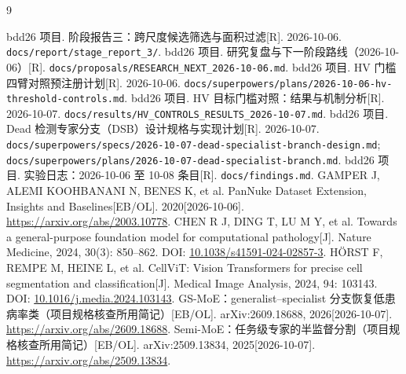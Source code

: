 \documentclass[11pt,a4paper,UTF8,fontset=fandol]{ctexart}
\newcommand{\code}[1]{\nolinkurl{#1}}
\begin{document}
\begin{thebibliography}{9}
\raggedright
{} bdd26 项目. 阶段报告三：跨尺度候选筛选与面积过滤[R]. 2026-10-06. \code{docs/report/stage_report_3/}.
 bdd26 项目. 研究复盘与下一阶段路线（2026-10-06）[R]. \code{docs/proposals/RESEARCH_NEXT_2026-10-06.md}.
 bdd26 项目. HV 门槛四臂对照预注册计划[R]. 2026-10-06. \code{docs/superpowers/plans/2026-10-06-hv-threshold-controls.md}.
 bdd26 项目. HV 目标门槛对照：结果与机制分析[R]. 2026-10-07. \code{docs/results/HV_CONTROLS_RESULTS_2026-10-07.md}.
 bdd26 项目. Dead 检测专家分支（DSB）设计规格与实现计划[R]. 2026-10-07. \code{docs/superpowers/specs/2026-10-07-dead-specialist-branch-design.md}; \code{docs/superpowers/plans/2026-10-07-dead-specialist-branch.md}.
 bdd26 项目. 实验日志：2026-10-06 至 10-08 条目[R]. \code{docs/findings.md}.
 GAMPER J, ALEMI KOOHBANANI N, BENES K, et al. PanNuke Dataset Extension, Insights and Baselines[EB/OL]. 2020[2026-10-06]. \url{https://arxiv.org/abs/2003.10778}.
 CHEN R J, DING T, LU M Y, et al. Towards a general-purpose foundation model for computational pathology[J]. Nature Medicine, 2024, 30(3): 850--862. DOI: \href{https://doi.org/10.1038/s41591-024-02857-3}{10.1038/s41591-024-02857-3}.
 H\"ORST F, REMPE M, HEINE L, et al. CellViT: Vision Transformers for precise cell segmentation and classification[J]. Medical Image Analysis, 2024, 94: 103143. DOI: \href{https://doi.org/10.1016/j.media.2024.103143}{10.1016/j.media.2024.103143}.
 GS-MoE：generalist--specialist 分支恢复低患病率类（项目规格核查所用简记）[EB/OL]. arXiv:2609.18688, 2026[2026-10-07]. \url{https://arxiv.org/abs/2609.18688}.
 Semi-MoE：任务级专家的半监督分割（项目规格核查所用简记）[EB/OL]. arXiv:2509.13834, 2025[2026-10-07]. \url{https://arxiv.org/abs/2509.13834}.
\end{thebibliography}
\end{document}
